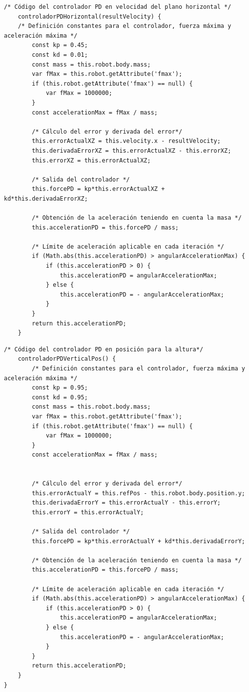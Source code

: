 \footnotesize {
\begin{verbatim}
/* Código del controlador PD en velocidad del plano horizontal */
    controladorPDHorizontal(resultVelocity) {
    /* Definición constantes para el controlador, fuerza máxima y aceleración máxima */
        const kp = 0.45;
        const kd = 0.01;
        const mass = this.robot.body.mass;
        var fMax = this.robot.getAttribute('fmax');
        if (this.robot.getAttribute('fmax') == null) {
	    	var fMax = 1000000;
	    }
        const accelerationMax = fMax / mass;

        /* Cálculo del error y derivada del error*/
        this.errorActualXZ = this.velocity.x - resultVelocity;
        this.derivadaErrorXZ = this.errorActualXZ - this.errorXZ;
        this.errorXZ = this.errorActualXZ;

        /* Salida del controlador */
        this.forcePD = kp*this.errorActualXZ + kd*this.derivadaErrorXZ;
        
        /* Obtención de la aceleración teniendo en cuenta la masa */
        this.accelerationPD = this.forcePD / mass;

        /* Límite de aceleración aplicable en cada iteración */
        if (Math.abs(this.accelerationPD) > angularAccelerationMax) {
            if (this.accelerationPD > 0) {
                this.accelerationPD = angularAccelerationMax;
            } else {
                this.accelerationPD = - angularAccelerationMax;
            }
        }
        return this.accelerationPD;
    }
\end{verbatim}
}

\footnotesize {
\begin{verbatim}  
/* Código del controlador PD en posición para la altura*/
    controladorPDVerticalPos() {
        /* Definición constantes para el controlador, fuerza máxima y                   aceleración máxima */
        const kp = 0.95;
        const kd = 0.95;
        const mass = this.robot.body.mass;
        var fMax = this.robot.getAttribute('fmax');
        if (this.robot.getAttribute('fmax') == null) {
	    	var fMax = 1000000;
	    }
        const accelerationMax = fMax / mass;
        

        /* Cálculo del error y derivada del error*/
        this.errorActualY = this.refPos - this.robot.body.position.y;
        this.derivadaErrorY = this.errorActualY - this.errorY;
        this.errorY = this.errorActualY;
        
        /* Salida del controlador */
        this.forcePD = kp*this.errorActualY + kd*this.derivadaErrorY;
        
        /* Obtención de la aceleración teniendo en cuenta la masa */
        this.accelerationPD = this.forcePD / mass;

        /* Límite de aceleración aplicable en cada iteración */
        if (Math.abs(this.accelerationPD) > angularAccelerationMax) {
            if (this.accelerationPD > 0) {
                this.accelerationPD = angularAccelerationMax;
            } else {
                this.accelerationPD = - angularAccelerationMax;
            }
        }
        return this.accelerationPD;
    }
}
\end{verbatim}
}

